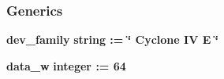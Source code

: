 \subsubsection*{Generics}
 \begin{DoxyCompactItemize}
\item 
{\bf dev\+\_\+family} {\bfseries {\bfseries \textcolor{comment}{string}\textcolor{vhdlchar}{ }\textcolor{vhdlchar}{ }\textcolor{vhdlchar}{\+:}\textcolor{vhdlchar}{=}\textcolor{vhdlchar}{ }\textcolor{vhdlchar}{ }\textcolor{vhdlchar}{ }\textcolor{vhdlchar}{ }\textcolor{keyword}{\char`\"{} Cyclone I\+V E \char`\"{}}\textcolor{vhdlchar}{ }}}
\item 
{\bf data\+\_\+w} {\bfseries {\bfseries \textcolor{comment}{integer}\textcolor{vhdlchar}{ }\textcolor{vhdlchar}{ }\textcolor{vhdlchar}{\+:}\textcolor{vhdlchar}{=}\textcolor{vhdlchar}{ }\textcolor{vhdlchar}{ } \textcolor{vhdldigit}{64} \textcolor{vhdlchar}{ }}}
\end{DoxyCompactItemize}
